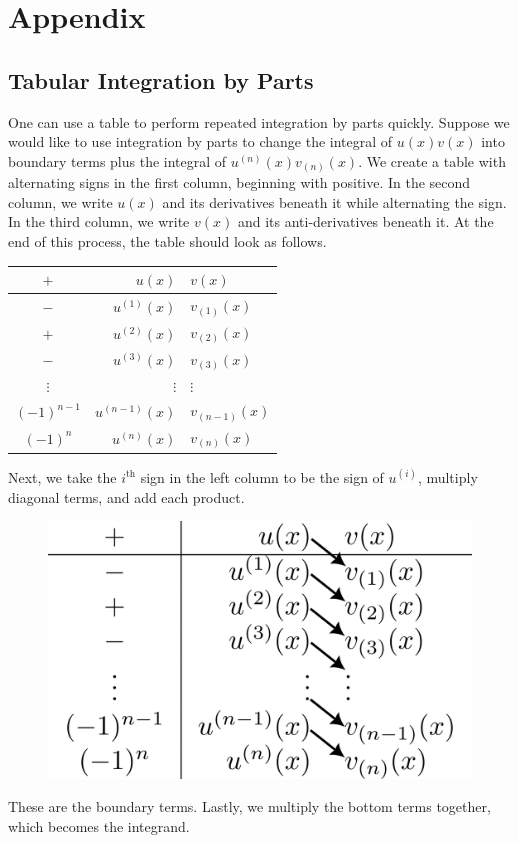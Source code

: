 \newpage
\section{Appendix}
\subsection{Tabular Integration by Parts}
\label{appendix:parts}
    One can use a table to perform repeated integration by parts quickly. Suppose we would like to use integration by parts to change the integral of \(u(x)v(x)\) into boundary terms plus the integral of \(u^{(n)}(x)v_{(n)}(x)\). We create a table with alternating signs in the first column, beginning with positive. In the second column, we write \(u(x)\) and its derivatives beneath it while alternating the sign. In the third column, we write \(v(x)\) and its anti-derivatives beneath it. At the end of this process, the table should look as follows.
    \begin{table}[H]
        \centering
        \begin{tabular}{c|rl}
            \(+\) & \(u(x)\) & \(v(x)\)\\
            \hline
            \(-\) &\(u^{(1)}(x)\) & \(v_{(1)}(x)\)\\
            \(+\) & \(u^{(2)}(x)\) & \(v_{(2)}(x)\)\\
            \(-\) & \(u^{(3)}(x)\) & \(v_{(3)}(x)\)\\
            \(\vdots\) &\(\vdots\) & \(\vdots \)\\
            \((-1)^{n-1}\) & \(u^{(n-1)}(x)\) & \(v_{(n-1)}(x)\)\\
            \((-1)^n\) & \(u^{(n)}(x)\) & \(v_{(n)}(x)\)
        \end{tabular}
    \end{table}
    Next, we take the \(i^{\mathrm{th}}\) sign in the left column to be the sign of \(u^{(i)}\), multiply diagonal terms, and add each product.
    \begin{figure}[H]
        \centering
        \includegraphics[width=0.34\linewidth]{include/tabular-boundary.png}
    \end{figure}
    These are the boundary terms. Lastly, we multiply the bottom terms together, which becomes the integrand. 

